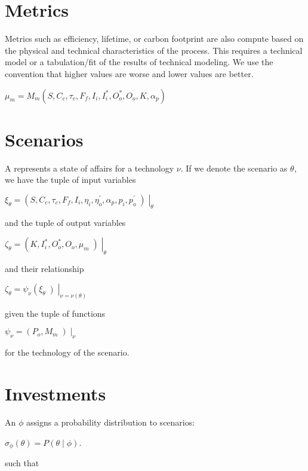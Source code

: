 \documentclass[letterpaper,10pt,english]{sphinxmanual}
\begin{document}
\section{Metrics}
\label{\detokenize{formulation:metrics}}
\sphinxAtStartPar
Metrics such as efficiency, lifetime, or carbon footprint are also
compute based on the physical and technical characteristics of the
process. This requires a technical model or a tabulation/fit of the
results of technical modeling. We use the convention that higher values
are worse and lower values are better.

\sphinxAtStartPar
\(\mu_m = M_m(S, C_c, \tau_c, F_f, I_i, I^*_i, O^*_o, O_o, K, \alpha_p)\)


\section{Scenarios}
\label{\detokenize{formulation:scenarios}}
\sphinxAtStartPar
A  represents a state of affairs for a technology \(\nu\).
If we denote the scenario as \(\theta\), we have the tuple of input
variables

\sphinxAtStartPar
\(\xi_\theta = \left(S, C_c, \tau_c, F_f, I_i, \eta_i, \eta^\prime_o, \alpha_p, p_i, p^\prime_o\middle) \right|_\theta\)

\sphinxAtStartPar
and the tuple of output variables

\sphinxAtStartPar
\(\zeta_\theta = \left(K, I^*_i, O^*_o, O_o, \mu_m\middle) \right|_\theta\)

\sphinxAtStartPar
and their relationship

\sphinxAtStartPar
\(\zeta_\theta = \psi_\nu\left(\xi_\theta\middle) \right|_{\nu = \nu(\theta)}\)

\sphinxAtStartPar
given the tuple of functions

\sphinxAtStartPar
\(\psi_\nu = \left(P_o, M_m\middle) \right|_\nu\)

\sphinxAtStartPar
for the technology of the scenario.


\section{Investments}
\label{\detokenize{formulation:investments}}
\sphinxAtStartPar
An  \(\phi\) assigns a probability distribution to
scenarios:

\sphinxAtStartPar
\(\sigma_\phi(\theta) = P\left(\theta \middle| \phi\right)\).

\sphinxAtStartPar
such that
\end{document}
